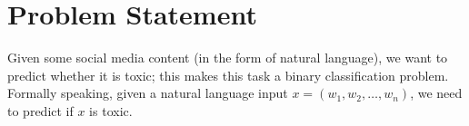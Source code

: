 \section{Problem Statement}

Given some social media content (in the form of natural language), we want to predict whether it is toxic; this makes this task a binary classification problem.
Formally speaking, given a natural language input $x = (w_1, w_2, \dots, w_n)$, we need to predict if $x$ is toxic.
